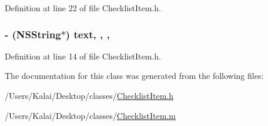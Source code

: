 Definition at line 22 of file Checklist\-Item.\-h.

\hypertarget{interface_checklist_item_aaa5b49b407e8e4d0fbd323eddef5b303}{
\subsubsection[{text}]{\setlength{\rightskip}{0pt plus 5cm}-\/ (N\-S\-String$\ast$) text\hspace{0.3cm}{\ttfamily [read]}, {\ttfamily [write]}, {\ttfamily [nonatomic]}, {\ttfamily [copy]}}}\label{interface_checklist_item_aaa5b49b407e8e4d0fbd323eddef5b303}


Definition at line 14 of file Checklist\-Item.\-h.



The documentation for this class was generated from the following files\-:\begin{DoxyCompactItemize}
\item 
/\-Users/\-Kalai/\-Desktop/classes/\hyperlink{_checklist_item_8h}{Checklist\-Item.\-h}\item 
/\-Users/\-Kalai/\-Desktop/classes/\hyperlink{_checklist_item_8m}{Checklist\-Item.\-m}\end{DoxyCompactItemize}
